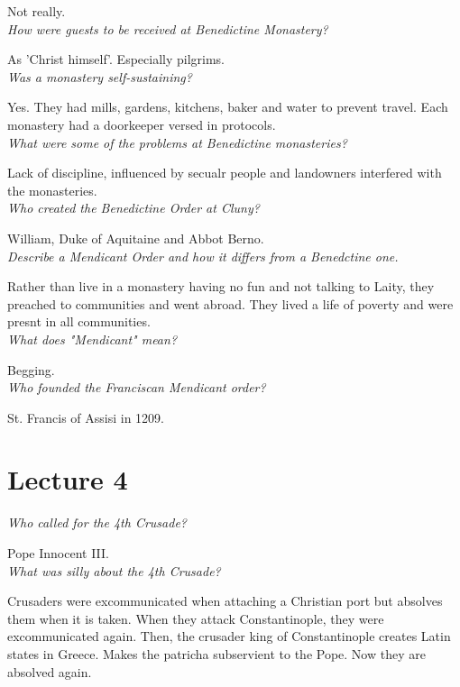 \documentclass[12pt]{article}
\begin{document}
Not really.\\

\textit{How were guests to be received at Benedictine Monastery?}

As 'Christ himself'. Especially pilgrims.\\

\textit{Was a monastery self-sustaining?}

Yes. They had mills, gardens, kitchens, baker and water to prevent travel. Each monastery had a doorkeeper versed in protocols.\\

\textit{What were some of the problems at Benedictine monasteries?}

Lack of discipline, influenced by secualr people and landowners interfered with the monasteries.\\

\textit{Who created the Benedictine Order at Cluny?}

William, Duke of Aquitaine and Abbot Berno.\\

\textit{Describe a Mendicant Order and how it differs from a Benedctine one.}

Rather than live in a monastery having no fun and not talking to Laity, they preached to communities and went abroad.
They lived a life of poverty and were presnt in all communities.\\

\textit{What does "Mendicant" mean?}

Begging.\\

\textit{Who founded the Franciscan Mendicant order?}

St. Francis of Assisi in 1209.\\

\section*{Lecture 4}

\textit{Who called for the 4th Crusade?}

Pope Innocent III.\\

\textit{What was silly about the 4th Crusade?}

Crusaders were excommunicated when attaching a Christian port but absolves them when it is taken. When they attack Constantinople, they were excommunicated again.
Then, the crusader king of Constantinople creates Latin states in Greece. Makes the patricha subservient to the Pope. Now they are absolved again.\\
\end{document}
